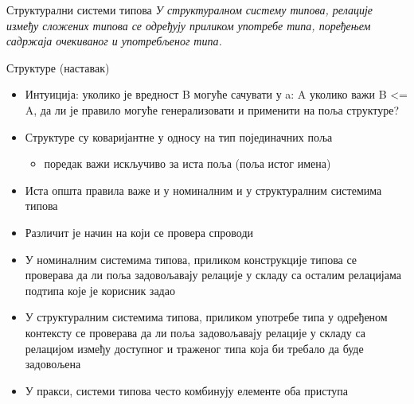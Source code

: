 \documentclass[xcolor=table]{beamer}
\begin{document}
    \begin{frame}{Структурални системи типова}
        \textit{У структуралном систему типова, релације између сложених типова се одређују приликом употребе типа, поређењем садржаја очекиваног и употребљеног типа.}
    \end{frame}

    \begin{frame}[allowframebreaks]{Структуре (наставак)}
        \begin{itemize}
            \item Интуиција: уколико је вредност B могуће сачувати у a: A уколико важи B <= A, да ли је правило могуће генерализовати и применити на поља структуре?
            \item Структуре су коваријантне у односу на тип појединачних поља
            \begin{itemize}
                \item поредак важи искључиво за иста поља (поља истог имена)
            \end{itemize}
            \item Иста општа правила важе и у номиналним и у структуралним системима типова
            \item Различит је начин на који се провера спроводи
        \end{itemize}

        \framebreak

        \begin{itemize}
            \item У номиналним системима типова, приликом конструкције типова се проверава да ли поља задовољавају релације у складу са осталим релацијама подтипа које је корисник задао
            \item У структуралним системима типова, приликом употребе типа у одређеном контексту се проверава да ли поља задовољавају релације у складу са релацијом између доступног и траженог типа која би требало да буде задовољена
            \item У пракси, системи типова често комбинују елементе оба приступа
        \end{itemize}
    \end{frame}
\end{document}
